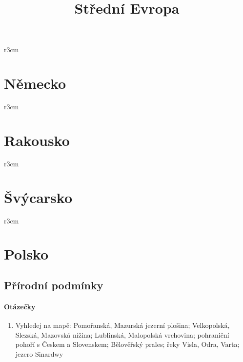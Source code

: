 \title{Střední Evropa}


\mbox{}
\vspace{-1.5cm}
\begin{wrapfigure}{r}{3cm}
\vspace{-200pt}
\end{wrapfigure}
\section{Německo}



\newpage
\mbox{}
\vspace{-1.5cm}
\begin{wrapfigure}{r}{3cm}
\vspace{-200pt}
\end{wrapfigure}
\section{Rakousko}



\newpage
\mbox{}
\vspace{-1.5cm}
\begin{wrapfigure}{r}{3cm}
\vspace{-200pt}
\end{wrapfigure}
\section{Švýcarsko}



\newpage
\mbox{}
\vspace{-1.5cm}
\begin{wrapfigure}{r}{3cm}
\vspace{-200pt}
\end{wrapfigure}
\section{Polsko}
\subsection{Přírodní podmínky}
\paragraph{Otázečky}
\begin{enumerate}
\item Vyhledej na mapě: Pomořanská, Mazurská jezerní plošina; Velkopolská, Slezská, Mazovská nížina; Lublinská, Malopolská vrchovina; pohraniční pohoří s Českem a Slovenskem; Bělověřský prales; řeky Visla, Odra, Varta; jezero Sinardwy
\end{enumerate}

